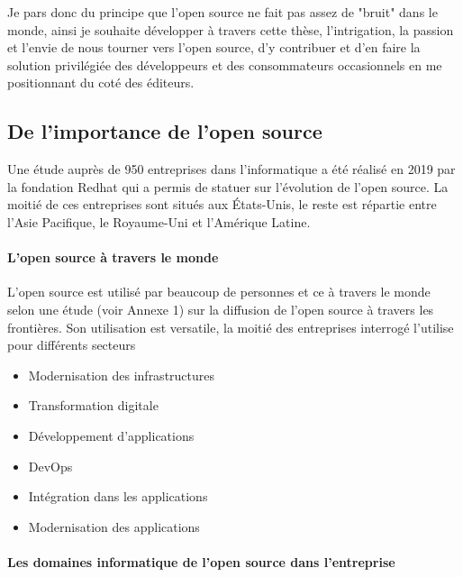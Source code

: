 			Je pars donc du principe que l'open source ne fait pas assez de "bruit" dans le monde, ainsi je souhaite développer à travers cette thèse, l'intrigation, la passion et l'envie de nous tourner vers l'open source, d'y contribuer et d'en faire la solution privilégiée des développeurs et des consommateurs occasionnels en me positionnant du coté des éditeurs.

		\subsection{De l'importance de l'open source}

				Une étude auprès de 950 entreprises dans l'informatique a été réalisé en 2019 par la fondation Redhat qui a permis de statuer sur l'évolution de l'open source. La moitié de ces entreprises sont situés aux États-Unis, le reste est répartie entre l'Asie Pacifique, le Royaume-Uni et l'Amérique Latine.

				\paragraph{L'open source à travers le monde\\}

					L'open source est utilisé par beaucoup de personnes et ce à travers le monde selon une étude (voir Annexe 1) sur la diffusion de l'open source à travers les frontières.
					Son utilisation est versatile, la moitié des entreprises interrogé l'utilise pour différents secteurs 

					\begin{itemize}[label=\textbullet, font=\LARGE \color{burntorange}]
					\item Modernisation des infrastructures
					\item Transformation digitale
					\item Développement d'applications
					\item DevOps
					\item Intégration dans les applications
					\item Modernisation des applications
					\end{itemize}

				\paragraph{Les domaines informatique de l'open source dans l'entreprise\\}

